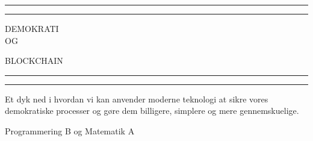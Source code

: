 \documentclass[a4paper, 8pt, oneside]{article} %
\begin{document}
\begin{titlepage} %

	\centering %

	\scshape %

	\vspace*{\baselineskip} %


	\rule{\textwidth}{1.6pt}\vspace*{-\baselineskip}\vspace*{2pt} %
	\rule{\textwidth}{0.4pt} %

	\vspace{0.75\baselineskip} %

	{\LARGE DEMOKRATI\\ OG\\ } %

	\vspace{0.75\baselineskip} %

	{\LARGE BLOCKCHAIN}

	\vspace{0.75\baselineskip} %

	\rule{\textwidth}{0.4pt}\vspace*{-\baselineskip}\vspace{3.2pt} %
	\rule{\textwidth}{1.6pt} %

	\vspace{2\baselineskip} %

	
	Et dyk ned i hvordan vi kan anvender moderne teknologi at sikre vores demokratiske processer og gøre dem billigere, simplere og mere gennemskuelige.\\

	\vspace*{1\baselineskip} %

	Programmering B og Matematik A%
	
	\vspace*{3\baselineskip} %
	

\end{titlepage}
\end{document}
